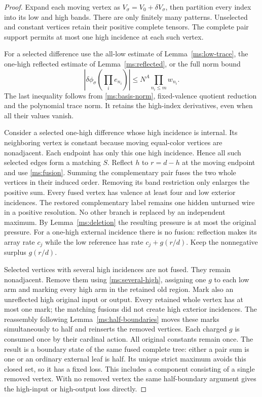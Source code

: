\begin{proof}
Expand each moving vertex as $V_\sigma=V_0+\delta V_\sigma$, then
partition every index into its low and high bands. There are only
finitely many patterns. Unselected and constant vertices retain their
positive complete tensors. The complete pair support permits at most
one high incidence at each such vertex.

For a selected difference use the all-low estimate
of Lemma~\ref{ms:low-trace}, the one-high reflected estimate of
Lemma~\ref{ms:reflected}, or the full norm bound
\begin{equation}\label{ms:several-high}
 |\delta\phi_\sigma(\prod_i e_{n_i})|
       \le N^A\prod_{n_i\le m}w_{n_i}.
\end{equation}
The last inequality follows from \eqref{ms:basis-norm}, fixed-valence
quotient reduction and the polynomial trace norm. It retains the
high-index derivatives, even when all their values vanish.

Consider a selected one-high difference whose high incidence is
internal. Its neighboring vertex is constant because moving
equal-color vertices are nonadjacent. Each endpoint has only this
one high incidence. Hence all such selected edges form a matching
$S$. Reflect $h$ to $r=d-h$ at the moving endpoint and use
\eqref{ms:fusion}. Summing the complementary pair fuses the two
whole vertices in their induced order. Removing its band restriction
only enlarges the positive sum. Every fused vertex has valence at
least four and low exterior incidences. The restored complementary
label remains one hidden unturned wire in a positive resolution.
No other branch is replaced by an independent maximum. By
Lemma~\ref{ms:deletion} the resulting pressure is at most the original
pressure. For a one-high external incidence there is no fusion:
reflection makes its array rate $c_j$ while the low reference has
rate $c_j+g(r/d)$. Keep the nonnegative surplus $g(r/d)$.

Selected vertices with several high incidences are not fused.
They remain nonadjacent. Remove them using \eqref{ms:several-high},
assigning one $g$ to each low arm and marking every high arm in the
retained old region. Mark also an unreflected high original input
or output. Every retained whole vertex has at most one mark; the
matching fusions did not create high exterior incidences.
The reassembly following Lemma~\ref{ms:half-boundaries} moves these
marks simultaneously to half and reinserts the removed vertices.
Each charged $g$ is consumed once by their cardinal action. All
original constants remain once. The result is a boundary state of
the same fused complete tree: either a pair sum is one or an
ordinary external leaf is half. Its unique strict maximum avoids
this closed set, so it has a fixed loss. This includes a component
consisting of a single removed vertex. With no removed vertex the
same half-boundary argument gives the high-input or high-output
loss directly.


\end{proof}
